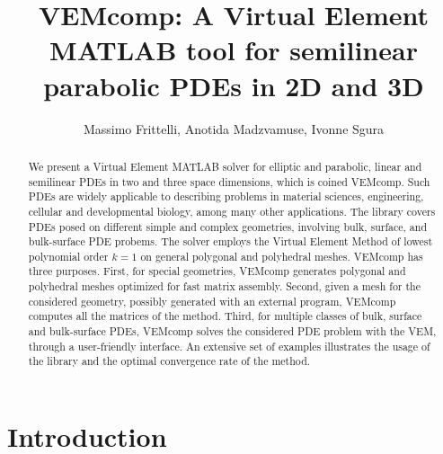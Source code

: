 \documentclass[a4paper]{article}
\begin{document}
 
\title{VEMcomp: A Virtual Element MATLAB tool for semilinear parabolic PDEs in 2D and 3D}
\author{Massimo Frittelli, Anotida Madzvamuse, Ivonne Sgura}

\maketitle

\begin{abstract}
We present a Virtual Element MATLAB solver for elliptic and parabolic, linear and semilinear PDEs in two and three space dimensions, which is coined VEMcomp.  Such PDEs are widely applicable to describing problems in material sciences, engineering, cellular and developmental biology, among many other applications. The library covers PDEs posed on different simple and complex geometries,  involving  bulk, surface,  and bulk-surface PDE probems. The solver employs the Virtual Element Method of lowest polynomial order $k=1$ on general polygonal and polyhedral meshes.  VEMcomp has three purposes.
First,  for special geometries,  VEMcomp generates polygonal and polyhedral meshes optimized for fast matrix assembly. Second, given a mesh for the considered geometry, possibly generated with an external program, VEMcomp computes all the matrices of the method.
Third, for multiple classes of bulk, surface and bulk-surface PDEs,  VEMcomp solves the considered PDE problem with the VEM,  through a user-friendly interface.  An extensive set of examples illustrates the usage of the library and the optimal convergence rate of the method.
\end{abstract}

\section{Introduction}
\end{document}
